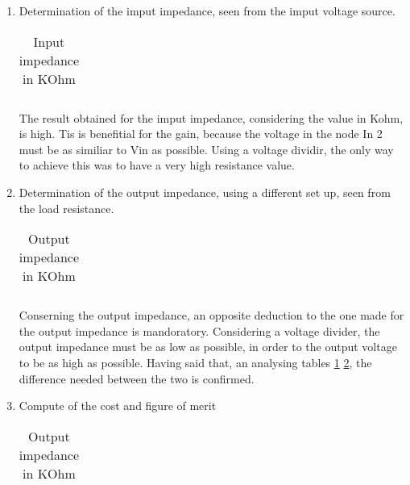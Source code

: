 \begin{enumerate}
\begin{itemize}
\end{itemize}


\item Determination of the imput impedance, seen from the imput voltage source.

\begin{table}[ht]
  \centering
  \begin{tabular}{|l|r|}
    \hline    
   
   \end{tabular}
  \caption{Input impedance in KOhm}
    \label{tab:ZI}
\end{table}

\par The result obtained for the imput impedance, considering the value in Kohm, is high. Tis is benefitial for the gain, because the voltage in the node In 2 must be as similiar to Vin as possible. Using a voltage dividir, the only way to achieve this was to have a very high resistance value.

\item Determination of the output impedance, using a different set up, seen from the load resistance. 

\begin{table}[ht]
  \centering
  \begin{tabular}{|l|r|}
    \hline    
   
   \end{tabular}
  \caption{Output impedance in KOhm}
  
  \label{tab:ZO}
\end{table}


Conserning the output impedance, an opposite deduction to the one made for the output impedance is mandoratory. Considering a voltage divider, the output impedance must be as low as possible, in order to the output voltage to be as high as possible. Having said that, an analysing tables \ref{tab:ZI} \ref{tab:ZO}, the difference needed between the two is confirmed.

\item Compute of the cost and figure of merit


\begin{table}[ht]
  \centering
  \begin{tabular}{|l|r|}
    \hline    
   
   \end{tabular}
  \caption{Output impedance in KOhm}
  \label{tab:cost}
\end{table}






\end{enumerate}



